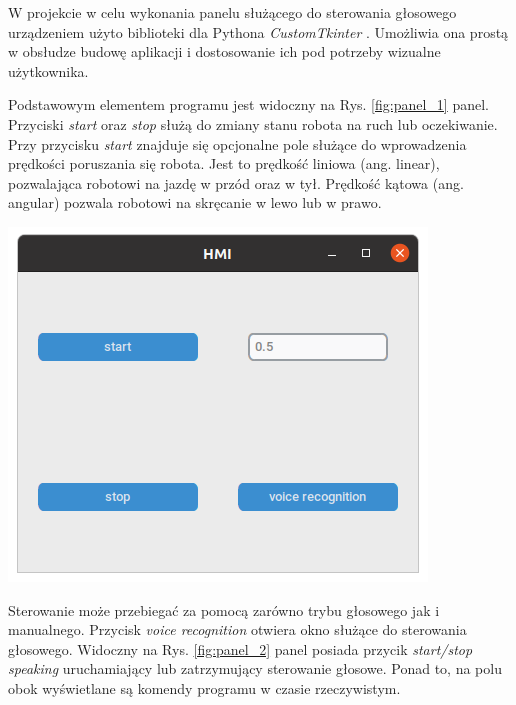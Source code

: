 W projekcie w celu wykonania panelu służącego do sterowania głosowego urządzeniem użyto biblioteki dla Pythona \textit{CustomTkinter} \cite{ctk}. Umożliwia ona prostą w obsłudze budowę aplikacji i dostosowanie ich pod potrzeby wizualne użytkownika.

Podstawowym elementem programu jest widoczny na Rys. \ref{fig:panel_1} panel. Przyciski \textit{start} oraz \textit{stop} służą do zmiany stanu robota na ruch lub oczekiwanie. Przy przycisku \textit{start} znajduje się opcjonalne pole służące do wprowadzenia prędkości poruszania się robota. Jest to prędkość liniowa (ang. linear), pozwalająca robotowi na jazdę w przód oraz w tył. Prędkość kątowa (ang. angular) pozwala robotowi na skręcanie w lewo lub w prawo. 
\begin{center}
    \includegraphics[width=0.8\linewidth]{files/panel_1.png}
    \label{fig:panel_1}
\end{center}

Sterowanie może przebiegać za pomocą zarówno trybu głosowego jak i manualnego. Przycisk \textit{voice recognition} otwiera okno służące do sterowania głosowego. Widoczny na Rys. \ref{fig:panel_2} panel posiada przycik \textit{start/stop speaking} uruchamiający lub zatrzymujący sterowanie głosowe. Ponad to, na polu obok wyświetlane są komendy programu w czasie rzeczywistym.

